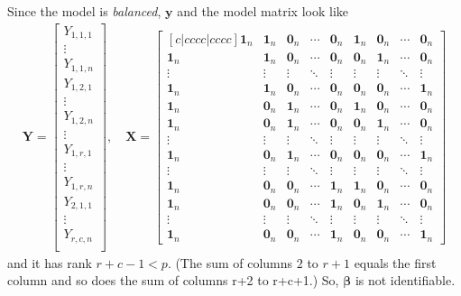 \documentclass[a4paper]{article}
\begin{document}
Since the model is \textit{balanced}, $\bm{y}$ and the model matrix look like
\begin{align*}
\bm{Y} = 
\begin{bmatrix}
Y_{1,1,1}\\
\vdots\\
Y_{1,1,n}\\
Y_{1,2,1}\\
\vdots\\
Y_{1,2,n}\\
\vdots\\
Y_{1,r,1}\\
\vdots\\
Y_{1,r,n}\\
Y_{2,1,1}\\
\vdots\\
Y_{r,c,n}\\
\end{bmatrix}
, \quad
\bm{X} = 
\begin{bmatrix}[c|cccc|cccc]
\bm{1}_{n} & \bm{1}_{n} & \bm{0}_{n} & \cdots & \bm{0}_{n} & \bm{1}_{n} & \bm{0}_{n} & \cdots & \bm{0}_{n}\\
\bm{1}_{n} & \bm{1}_{n} & \bm{0}_{n} & \cdots & \bm{0}_{n} & \bm{0}_{n} & \bm{1}_{n} & \cdots & \bm{0}_{n}\\
\vdots & \vdots & \vdots & \ddots & \vdots & \vdots & \vdots & \ddots & \vdots\\
\bm{1}_{n} & \bm{1}_{n} & \bm{0}_{n} & \cdots & \bm{0}_{n} & \bm{0}_{n} & \bm{0}_{n} & \cdots & \bm{1}_{n}\\
\hline
\bm{1}_{n} & \bm{0}_{n} & \bm{1}_{n} & \cdots & \bm{0}_{n} & \bm{1}_{n} & \bm{0}_{n} & \cdots & \bm{0}_{n}\\
\bm{1}_{n} & \bm{0}_{n} & \bm{1}_{n} & \cdots & \bm{0}_{n} & \bm{0}_{n} & \bm{1}_{n} & \cdots & \bm{0}_{n}\\
\vdots & \vdots & \vdots & \ddots & \vdots & \vdots & \vdots & \ddots & \vdots\\
\bm{1}_{n} & \bm{0}_{n} & \bm{1}_{n} & \cdots & \bm{0}_{n} & \bm{0}_{n} & \bm{0}_{n} & \cdots & \bm{1}_{n}\\
\hline
\vdots & \vdots & \vdots & \ddots & \vdots & \vdots & \vdots & \ddots & \vdots\\
\hline
\bm{1}_{n} & \bm{0}_{n} & \bm{0}_{n} & \cdots & \bm{1}_{n} & \bm{1}_{n} & \bm{0}_{n} & \cdots & \bm{0}_{n}\\
\bm{1}_{n} & \bm{0}_{n} & \bm{0}_{n} & \cdots & \bm{1}_{n} & \bm{0}_{n} & \bm{1}_{n} & \cdots & \bm{0}_{n}\\
\vdots & \vdots & \vdots & \ddots & \vdots & \vdots & \vdots & \ddots & \vdots\\
\bm{1}_{n} & \bm{0}_{n} & \bm{0}_{n} & \cdots & \bm{1}_{n} & \bm{0}_{n} & \bm{0}_{n} & \cdots & \bm{1}_{n}
\end{bmatrix}
\end{align*}
and it has rank $r+c-1 < p$. (The sum of columns $2$ to $r+1$ equals the first column and so does the sum of columns r+2 to r+c+1.) So, $\bm{\beta}$ is not identifiable.
\end{document}
